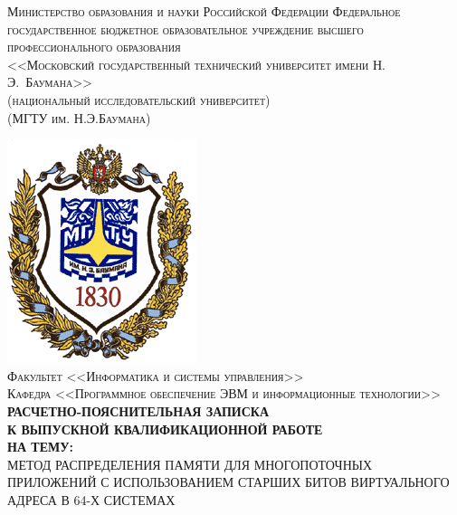 \newcommand{\HRule}{\rule{\linewidth}{0.5mm}}
\fontsize{14}{14pt}\selectfont
\begin{center}

\textsc{
Министерство образования и науки Российской Федерации
Федеральное государственное бюджетное образовательное учреждение 
высшего профессионального образования\\
<<Московский государственный технический университет имени Н.\,Э.~Баумана>>\\
(национальный исследовательский университет)\\
(МГТУ им. Н.Э.Баумана)\\}

\includegraphics[scale=0.5]{images/bmstu-logo.png}\\

\textsc{Факультет <<Информатика и системы управления>>}\\
\textsc{Кафедра <<Программное обеспечение ЭВМ и информационные технологии>>}\\[1cm]

\textsc{\large \bfseries РАСЧЕТНО-ПОЯСНИТЕЛЬНАЯ ЗАПИСКА\\К ВЫПУСКНОЙ КВАЛИФИКАЦИОННОЙ РАБОТЕ\\НА ТЕМУ:}\\[1cm]

\textsc{\large  МЕТОД РАСПРЕДЕЛЕНИЯ ПАМЯТИ ДЛЯ МНОГОПОТОЧНЫХ ПРИЛОЖЕНИЙ С ИСПОЛЬЗОВАНИЕМ СТАРШИХ БИТОВ ВИРТУАЛЬНОГО АДРЕСА В 64-Х СИСТЕМАХ}

\vfill


\end{center}
